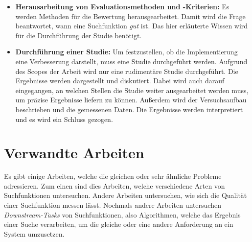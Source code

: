 \begin{itemize}
         Es wird die Weaviate\footnote{https://weaviate.io/} Vektordatenbank verwendet, um Dokumente zu indizieren.
   \item \textbf{Herausarbeitung von Evaluationsmethoden und -Kriterien:}
         Es werden Methoden für die Bewertung herausgearbeitet.
         Damit wird die Frage beantwortet, wann eine Suchfunktion \textit{gut} ist.
         Das hier erläuterte Wissen wird für die Durchführung der Studie benötigt.
   \item \textbf{Durchführung einer Studie:}
         Um festzustellen, ob die Implementierung eine Verbesserung darstellt, muss eine Studie durchgeführt werden.
         Aufgrund des Scopes der Arbeit wird nur eine rudimentäre Studie durchgeführt.
         Die Ergebnisse werden dargestellt und diskutiert.
         Dabei wird auch darauf eingegangen, an welchen Stellen die Studie weiter ausgearbeitet werden muss, um präzise Ergebnisse liefern zu können.
         Außerdem wird der Versuchsaufbau beschrieben und die gemessenen Daten.
         Die Ergebnisse werden interpretiert und es wird ein Schluss gezogen.
\end{itemize}

\section{Verwandte Arbeiten}

Es gibt einige Arbeiten, welche die gleichen oder sehr ähnliche Probleme adressieren.
Zum einen sind dies Arbeiten, welche verschiedene Arten von Suchfunktionen untersuchen.
Andere Arbeiten untersuchen, wie sich die Qualität einer Suchfunktion messen lässt.
Nochmals andere Arbeiten untersuchen \textit{Downstream-Tasks} von Suchfunktionen, also Algorithmen, welche das Ergebnis einer Suche verarbeiten, um die gleiche oder eine andere Anforderung an ein System umzusetzen.\\


